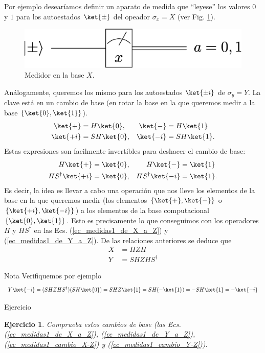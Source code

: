 \documentclass[a4paper,11pt]{book} %
\newtheorem{ejercicio_contador}{Ejercicio}
\newcommand{\Ejercicio}[1]{
		\begin{mybox_gray}{Ejercicio} 
			\begin{ejercicio_contador}
				 #1 
			\end{ejercicio_contador} 
		\end{mybox_gray}
	}
\numberwithin{equation}{chapter}
\def\lch{\left\{}
\def\rch{\right\}}
\begin{document}
Por ejemplo desearíamos definir un aparato de medida que ``leyese'' los valores $0$ y $1$ para los autoestados $\ket{\pm}$ del opeador $\sigma_x =  X$ (ver Fig. \ref{Fig_medidas1_meter_xbasis2}).
	\begin{figure}[H]
	\centering 
	\includegraphics[width=0.3\linewidth]{Figuras/Fig_medidas1_meter_xbasis2}
	\caption{Medidor en la base $X$.}
	\label{Fig_medidas1_meter_xbasis2}
	\end{figure}
Análogamente, queremos los mismo para los autoestados $\ket{\pm i}$ de $\sigma_y = Y$. La clave está en un cambio de base (en rotar la base en la que queremos medir a la base $\lch \ket{0}, \ket{1} \rch$). 
\begin{align}
\ket{+}  &= H\ket{0}  ,&  \ket{-}  &= H\ket{1}    \\ 
\ket{+i}  &= SH \ket{0}    ,&  \ket{-i}  &= SH\ket{1}   .
\end{align}
Estas expresiones son facilmente invertibles para deshacer el cambio de base:
\begin{align}
H \ket{+}  &= \ket{0}                ,&  H\ket{-}  & = \ket{1}   \label{ec_medidas1_de_X_a_Z} \\ 
H S^\dagger \ket{+i}  &=  \ket{0}    ,&  H S^\dagger  \ket{-i}  & = \ket{1}   . \label{ec_medidas1_de_Y_a_Z}
\end{align}
Es decir, la idea es llevar a cabo una operación que nos lleve los elementos de la base en la que queremos medir (los elementos $\{\ket{+},\ket{-} \}$ o  $\{\ket{+i},\ket{-i} \}$) a los elementos de la base computacional $\{\ket{0},\ket{1} \}$. Esto es precisamente lo que conseguimos con los operadores $H$ y $H S^\dagger$ en las Ecs. (\ref{ec_medidas1_de_X_a_Z}) y (\ref{ec_medidas1_de_Y_a_Z}).
De las relaciones anteriores se deduce que
\begin{align}
X & = H Z H   \label{ec_medidas1_cambio_X-Z} \\
Y & = S  H  Z   H S^\dagger \label{ec_medidas1_cambio_Y-Z}
\end{align}

	\begin{mybox_blue}{Nota}
	Verifiquemos por ejemplo
	$$
	Y \ket{-i} = (SHZHS^\dagger )(SH\ket{0}) = SH Z\ket{1} =  SH(-\ket{1})= - SH\ket{1} = -\ket{-i}
	$$
	\end{mybox_blue}

	\Ejercicio{Comprueba estos cambios de base (las Ecs. (\ref{ec_medidas1_de_X_a_Z}), (\ref{ec_medidas1_de_Y_a_Z}), (\ref{ec_medidas1_cambio_X-Z}) y (\ref{ec_medidas1_cambio_Y-Z})).}
	
\end{document}
